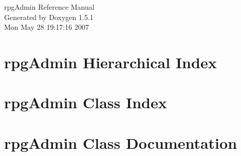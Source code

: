 \documentclass[a4paper]{book}
\begin{document}
\begin{titlepage}
\vspace*{7cm}
\begin{center}
{\Large rpg\-Admin Reference Manual}\\
\vspace*{1cm}
{\large Generated by Doxygen 1.5.1}\\
\vspace*{0.5cm}
{\small Mon May 28 19:17:16 2007}\\
\end{center}
\end{titlepage}
\clearemptydoublepage
{}
\tableofcontents
\clearemptydoublepage
{}
\chapter{rpg\-Admin Hierarchical Index}

\chapter{rpg\-Admin Class Index}

\chapter{rpg\-Admin Class Documentation}









\printindex
\end{document}
